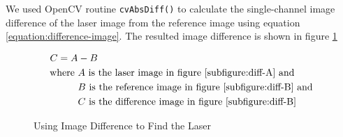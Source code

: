 We used OpenCV routine \texttt{cvAbsDiff()} to calculate the single-channel image difference of the laser image from the reference image using equation \ref{equation:difference-image}. The resulted image difference is shown in figure \ref{figure:difference-image}

\begin{align}
\label{equation:difference-image}				
C = A &- B \\
\text{where}~ 
&A~ \text{is the laser image in figure \ref{subfigure:diff-A} and} \notag \\
&B~ \text{is the reference image in figure \ref{subfigure:diff-B} and} \notag \\
&C~ \text{is the difference image in figure \ref{subfigure:diff-B}} \notag
\end{align}


\begin{figure}[ht!]
\centering
{} \hfill
{} \hfill
{} \hfill
\label{figure:difference-image}
\caption{Using Image Difference to Find the Laser}
\end{figure}



